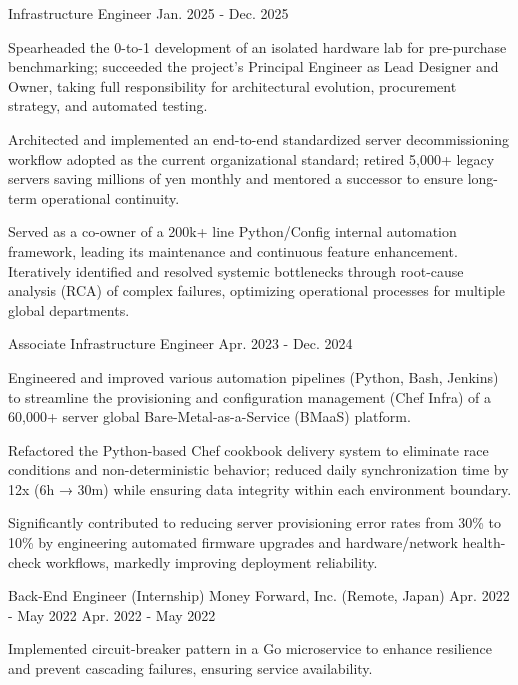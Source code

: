 \begin{cventries}
  \cventry
    {Infrastructure Engineer} %
    {} %
    {} %
    {Jan. 2025 - Dec. 2025} %
    {
      \begin{cvitems}
        \item {Spearheaded the 0-to-1 development of an isolated hardware lab for pre-purchase benchmarking; 
        succeeded the project's Principal Engineer as Lead Designer and Owner,
        taking full responsibility for architectural evolution, procurement strategy, and automated testing.}
        \item {Architected and implemented an end-to-end standardized server decommissioning workflow adopted as the current organizational standard;
        retired 5,000+ legacy servers saving millions of yen monthly and mentored a successor to ensure long-term operational continuity.}
        \item {Served as a co-owner of a 200k+ line Python/Config internal automation framework, leading its maintenance and continuous feature enhancement.
         Iteratively identified and resolved systemic bottlenecks through root-cause analysis (RCA) of complex failures, optimizing operational processes for multiple global departments.}
      \end{cvitems}
    }
  
  \cventry
    {Associate Infrastructure Engineer} %
    {} %
    {} %
    {Apr. 2023 - Dec. 2024} %
    {
        \begin{cvitems}
        \item {Engineered and improved various automation pipelines (Python, Bash, Jenkins) to streamline the provisioning and configuration management (Chef Infra) of a 60,000+ server global Bare-Metal-as-a-Service (BMaaS) platform.}
        \item {Refactored the Python-based Chef cookbook delivery system to eliminate race conditions and non-deterministic behavior; reduced daily synchronization time by 12x (6h → 30m) while ensuring data integrity within each environment boundary.}
        \item {Significantly contributed to reducing server provisioning error rates from 30\% to 10\% by engineering automated firmware upgrades and hardware/network health-check workflows, markedly improving deployment reliability.}
        \end{cvitems}
    }

  \cventry
    {Back-End Engineer (Internship)} %
    {Money Forward, Inc. (Remote, Japan)} %
    {Apr. 2022 - May 2022} %
    {Apr. 2022 - May 2022} %
    {
        \begin{cvitems}
        \item {Implemented circuit-breaker pattern in a Go microservice to enhance resilience and prevent cascading failures, ensuring service availability.}
        \end{cvitems}
    }



\end{cventries}
